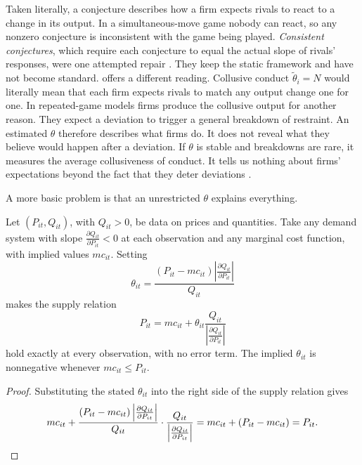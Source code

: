  Taken literally, a conjecture describes how a firm expects rivals
to react to a change in its output. In a simultaneous-move game nobody can react, so any nonzero conjecture is
inconsistent with the game being played. \emph{Consistent conjectures}, which require each conjecture to equal the
actual slope of rivals' responses, were one attempted repair \citep{Bresnahan1981a}. They keep the static framework
and have not become standard. \citet[pp.~1028--1029]{Bresnahan1989} offers a different reading. Collusive conduct
$\tilde\theta_i = N$ would literally mean that each firm expects rivals to match any output change one for one. In
repeated-game models firms produce the collusive output for another reason. They expect a deviation to trigger a
general breakdown of restraint. An estimated $\theta$ therefore describes what firms do. It does not reveal what they
believe would happen after a deviation. If $\theta$ is stable and breakdowns are rare, it measures the average collusiveness of
conduct. It tells us nothing about firms' expectations beyond the fact that they deter deviations
\citep[n.~19]{Bresnahan1989}.

A more basic problem is that an unrestricted $\theta$ explains everything.

\begin{proposition}\label{prop:02-theta-fit}
Let $(P_{it}, Q_{it})$, with $Q_{it} > 0$, be data on prices and quantities. Take any demand system with slope
$\frac{\partial Q_{it}}{\partial P_{it}} < 0$ at each observation and any marginal cost function, with implied
values $mc_{it}$. Setting
\begin{equation*}
\theta_{it} = \frac{\left(P_{it} - mc_{it}\right)\left|\frac{\partial Q_{it}}{\partial P_{it}}\right|}{Q_{it}}
\end{equation*}
makes the supply relation
\[
P_{it} = mc_{it} + \theta_{it}\frac{Q_{it}}{\left|\frac{\partial Q_{it}}{\partial P_{it}}\right|}
\]
hold exactly at every observation, with no error term. The implied $\theta_{it}$ is nonnegative whenever
$mc_{it} \le P_{it}$.
\end{proposition}

\begin{proof}
Substituting the stated $\theta_{it}$ into the right side of the supply relation gives
\[
mc_{it} + \frac{(P_{it} - mc_{it})\left|\frac{\partial Q_{it}}{\partial P_{it}}\right|}{Q_{it}}
\cdot\frac{Q_{it}}{\left|\frac{\partial Q_{it}}{\partial P_{it}}\right|} = mc_{it} + (P_{it} - mc_{it}) = P_{it} . \qedhere
\]
\end{proof}

